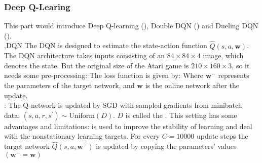 \documentclass[12pt]{report}
\begin{document}
\subsubsection{Deep Q-Learing}
This part would introduce Deep Q-learning (\cite{mnih2015human}), Double DQN (\cite{van2016deep}) and Dueling DQN (\cite{wang2016dueling}).\\
\sep{DQN}
The DQN is designed to estimate the state-action function $\hat{Q}(s,a,\mathbf{w})$.
The DQN architecture takes inputs consisting of an $84\times 84\times 4$ image, which denotes the state. But the original size of the
Atari game is $210\times160\times3$, so it needs some pre-processing:
The loss function is given by:
Where $\mathbf{w}^-$ represents the parameters of the target network, and $\mathbf{w}$ is the online network after the update.\\
: The Q-network is updated by SGD with sampled gradients from minibatch data: $(s,a,r,s^{\prime})\sim\mathrm{Uniform}(D).$
$D$ is called the . This setting has some advantages and limitations:
 is used to improve the stability of learning and deal with the nonstationary learning targets.
For every $C=10000$ update steps the target network $\hat{Q}(s,a,\mathbf{w}^{-})$ is updated by copying the parameters' values $(\mathbf{w}^{-}=\mathbf{w})$
\end{document}
